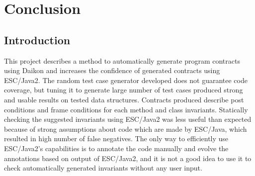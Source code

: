 \chapter{Conclusion}
\label{chap:conclusion}

\section{Introduction}\label{sec:intro7}

This project describes a method to automatically generate program contracts using Daikon and increases the confidence of generated contracts using ESC/Java2. The random test case generator developed does not guarantee code coverage, but tuning it to generate large number of test cases produced strong and usable results on tested data structures. Contracts produced describe post conditions and frame conditions for each method and class invariants. Statically checking the suggested invariants using ESC/Java2 was less useful than expected because of strong assumptions about code which are made by ESC/Java, which resulted in high number of false negatives. The only way to efficiently use ESC/Java2’s capabilities is to annotate the code manually and evolve the annotations based on output of ESC/Java2, and it is not a good idea to use it to check automatically generated invariants without any user input.


